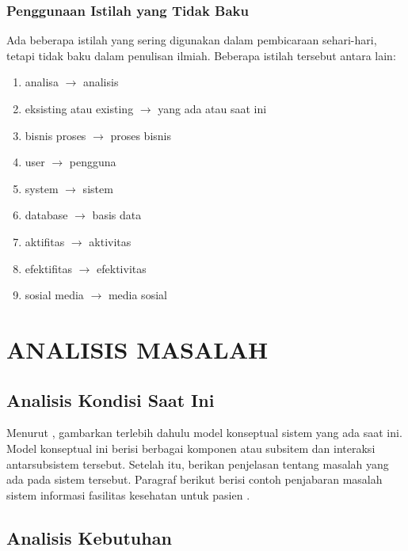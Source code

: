 \documentclass[12pt,a4paper,oneside]{book}
\begin{document}
\subsection{Penggunaan Istilah yang Tidak Baku}
Ada beberapa istilah yang sering digunakan dalam pembicaraan sehari-hari, tetapi tidak baku dalam penulisan ilmiah.
Beberapa istilah tersebut antara lain:
\begin{enumerate}
  \item analisa $\rightarrow$ analisis
  \item eksisting atau existing $\rightarrow$ yang ada atau saat ini
  \item bisnis proses $\rightarrow$ proses bisnis
  \item user $\rightarrow$ pengguna
  \item system $\rightarrow$ sistem
  \item database $\rightarrow$ basis data
  \item aktifitas $\rightarrow$ aktivitas
  \item efektifitas $\rightarrow$ efektivitas
  \item sosial media $\rightarrow$ media sosial
\end{enumerate}




\chapter{ANALISIS MASALAH}
\section{Analisis Kondisi Saat Ini}
Menurut \textcite{BPPT2020}, gambarkan terlebih dahulu model konseptual sistem yang ada saat ini. Model konseptual ini berisi berbagai komponen atau subsitem dan interaksi antarsubsistem tersebut. Setelah itu, berikan penjelasan tentang masalah yang ada pada sistem tersebut. Paragraf berikut berisi contoh penjabaran masalah sistem informasi fasilitas kesehatan untuk pasien \autocite{Halkiopoulos2024}. 
\section{Analisis Kebutuhan}
\lipsum[4]
\end{document}
